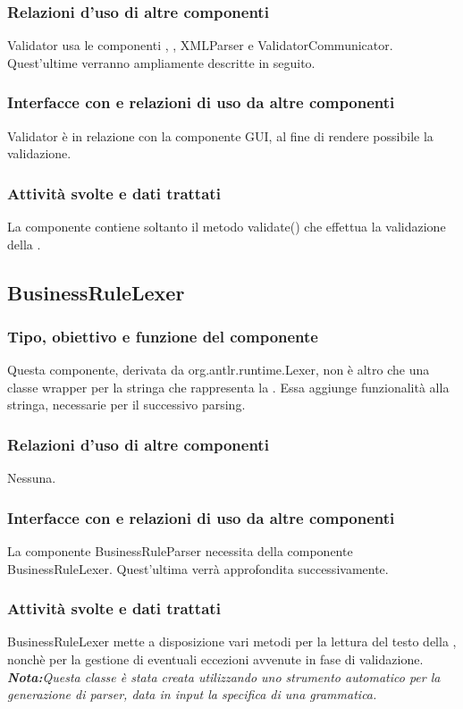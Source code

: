 \documentclass[11pt,titlepage,a4paper]{report}
\begin{document}
\subsubsection{Relazioni d'uso di altre componenti}
Validator usa le componenti \brp, \brl, XMLParser e ValidatorCommunicator. Quest'ultime verranno ampliamente descritte in seguito.
\subsubsection{Interfacce con e relazioni di uso da altre componenti}
Validator \`e in relazione con la componente GUI, al fine di rendere possibile la validazione.
\subsubsection{Attivit\`a svolte e dati trattati}
La componente contiene soltanto il metodo validate() che effettua la validazione della \br.

\subsection{BusinessRuleLexer}
\subsubsection{Tipo, obiettivo e funzione del componente}
Questa componente, derivata da org.antlr.runtime.Lexer, non \`e altro che una classe wrapper per la stringa che rappresenta la \br. Essa aggiunge funzionalit\`a alla stringa, necessarie per il successivo parsing.
\subsubsection{Relazioni d'uso di altre componenti}
Nessuna.
\subsubsection{Interfacce con e relazioni di uso da altre componenti}
La componente BusinessRuleParser necessita della componente BusinessRuleLexer. Quest'ultima verr\`a approfondita successivamente.
\subsubsection{Attivit\`a svolte e dati trattati}
BusinessRuleLexer mette a disposizione vari metodi per la lettura del testo della \br, nonch\`e per la gestione di eventuali eccezioni avvenute in fase di validazione.\\
\textit{\textbf{Nota:}Questa classe \`e stata creata utilizzando uno strumento automatico per la generazione di parser, data in input la specifica di una grammatica.}
\end{document}
